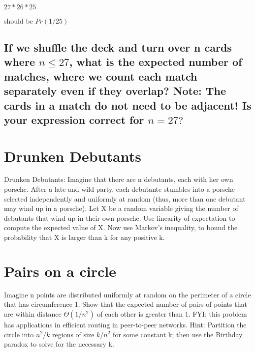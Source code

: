 \documentclass[titlepage]{article}\usepackage[]{graphicx}\usepackage[]{color}
\begin{document}
  $ 27 * 26 * 25 $ 

  should be $Pr(1/25)$



  \subsection{If we shuffle the deck and turn over n cards where $n ≤ 27$, what
	  is the expected number of matches, where we count each match separately
	  even if they overlap? Note: The cards in a match do not need to be
  adjacent! Is your expression correct for $n = 27?$}






  \section{ Drunken Debutants}
Drunken Debutants: Imagine that there are n debutants, each with her own
porsche. After a late and wild party, each debutante stumbles into a porsche
selected independently and uniformly at random (thus, more than one debutant
may wind up in a porsche). Let X be a random variable giving the number of
debutants that wind up in their own porsche. Use linearity of expectation to
compute the expected value of X. Now use Markov’s inequality, to bound the
probability that X is larger than k for any positive k.







  \section{ Pairs on a circle}
Imagine n points are distributed uniformly at random on the perimeter of a
circle that has circumference 1. Show that the expected number of pairs of
points that are within distance $\Theta(1/n^2)$ of each other is greater than 1. FYI:
this problem has applications in efficient routing in peer-to-peer networks.
Hint: Partition the circle into $n^2/k$ regions of size $k/n^2$ for some constant
k; then use the Birthday paradox to solve for the necessary k.

  
\end{document}
